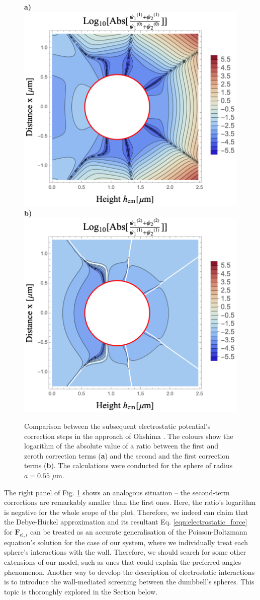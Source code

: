\documentclass{master_thesis}
\begin{document}
\begin{figure}
    \begin{minipage}{\linewidth}
         \centering
         \textbf{a)}
         \includegraphics[width=0.45\linewidth,valign=t]{figures/ohshima_first_corrections.png}
         \textbf{b)}
         \includegraphics[width=0.45\linewidth,valign=t]{figures/ohshima_second_corrections.png}
    \end{minipage}
    \caption{Comparison between the subsequent electrostatic potential's correction steps in the approach of Ohshima \cite{ohshima1998}. The colours show the logarithm of the absolute value of a ratio between the first and zeroth correction terms (\textbf{a}) and the second and the first correction terms (\textbf{b}). The calculations were conducted for the sphere of radius $a=0.55$ $\mu$m.}
    \label{fig:ohshima_corrections_compared}
\end{figure}

The right panel of Fig. \ref{fig:ohshima_corrections_compared} shows an analogous situation -- the second-term corrections are remarkably smaller than the first ones. Here, the ratio's logarithm is negative for the whole scope of the plot. Therefore, we indeed can claim that the Debye-Hückel approximation and its resultant Eq. \eqref{eqn:electrostatic_force} for $\boldsymbol{F}_{\textrm{el},i}$ can be treated as an accurate generalisation of the Poisson-Boltzmann equation's solution for the case of our system, where we individually treat each sphere's interactions with the wall. Therefore, we should search for some other extensions of our model, such as ones that could explain the preferred-angles phenomenon. Another way to develop the description of electrostatic interactions is to introduce the wall-mediated screening between the dumbbell's spheres. This topic is thoroughly explored in the Section below.
\end{document}
